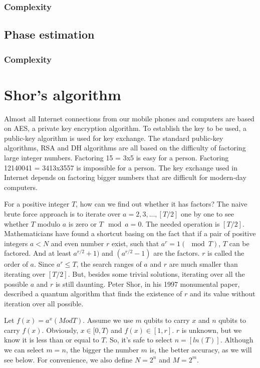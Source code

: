 \documentclass[oneside, letter, 12pt]{book}
\begin{document}
\subsubsection{Complexity}

\subsection{Phase estimation}
\subsubsection{Complexity}

\section{Shor's algorithm}
Almost all Internet connections from our mobile phones and computers are based on AES, a private key encryption algorithm. To establish the key to be used, a public-key algorithm is used for key exchange. The standard public-key algorithms, RSA and DH algorithms are all based on the difficulty of factoring large integer numbers. Factoring 15 = 3x5 is easy for a person. Factoring 12140041 = 3413x3557 is impossible for a person. The key exchange used in Internet depends on factoring bigger numbers that are difficult for modern-day computers.

For a positive integer $T$, how can we find out whether it has factors? The naive brute force approach is to iterate over $a=2, 3, ..., [T/2]$ one by one to see whether $T$ modulo $a$ is zero or $T \mod a = 0$. The needed operation is $[T/2]$. Mathematicians have found a shortcut basing on the fact that if a pair of positive integers $a < N$ and even number $r$ exist, such that $a^r = 1(\mod T)$, $T$ can be factored. And at least $a^{r/2}+1)$ and $(a^{r/2}-1)$ are the factors. $r$ is called the order of $a$. Since $a^r \leq T$, the search ranges of $a$ and $r$ are much smaller than iterating over $[T/2]$. But, besides some trivial solutions, iterating over all the possible $a$ and $r$ is still daunting. Peter Shor, in his 1997 monumental paper\cite{1997Shor}, described a quantum algorithm that finds the existence of $r$ and its value without iteration over all possible.

Let $f(x) = a^x (Mod T)$. Assume we use $m$ qubits to carry $x$ and $n$ qubits to carry $f(x)$. Obviously, $x\in [0, T)$ and $f(x) \in [1,r]$. $r$ is unknown, but we know it is less than or equal to $T$. So, it's safe to select $n = [ln(T)]$. Although we can select $m=n$, the bigger the number $m$ is, the better accuracy, as we will see below. For convenience, we also define $N=2^n$ and $M=2^m$.
\end{document}
